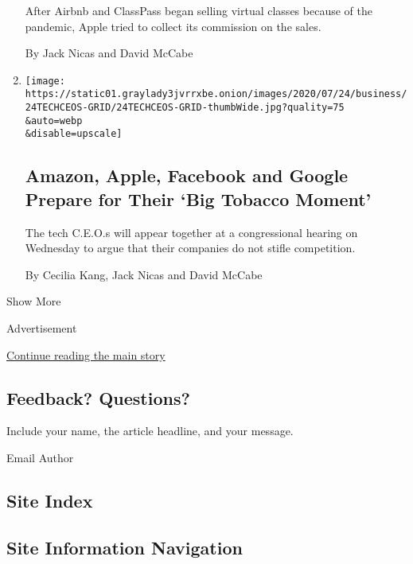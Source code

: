 \begin{enumerate}
  After Airbnb and ClassPass began selling virtual classes because of
  the pandemic, Apple tried to collect its commission on the sales.

  By Jack Nicas and David McCabe
\item
  \href{/2020/07/28/technology/amazon-apple-facebook-google-antitrust-hearing.html}{}

  \texttt{[image: https://static01.graylady3jvrrxbe.onion/images/2020/07/24/business/24TECHCEOS-GRID/24TECHCEOS-GRID-thumbWide.jpg?quality=75\\\&auto=webp\\\&disable=upscale]}

  \hypertarget{amazon-apple-facebook-and-google-prepare-for-their-big-tobacco-moment}{%
  \subsection{Amazon, Apple, Facebook and Google Prepare for Their `Big
  Tobacco
  Moment'}\label{amazon-apple-facebook-and-google-prepare-for-their-big-tobacco-moment}}

  The tech C.E.O.s will appear together at a congressional hearing on
  Wednesday to argue that their companies do not stifle competition.

  By Cecilia Kang, Jack Nicas and David McCabe
\end{enumerate}

Show More

Advertisement

\protect\hyperlink{after-mid2}{Continue reading the main story}

\hypertarget{feedback-questions}{%
\subsection{Feedback? Questions?}\label{feedback-questions}}

Include your name, the article headline, and your message.

Email Author

\hypertarget{site-index}{%
\subsection{Site Index}\label{site-index}}

\hypertarget{site-information-navigation}{%
\subsection{Site Information
Navigation}\label{site-information-navigation}}

